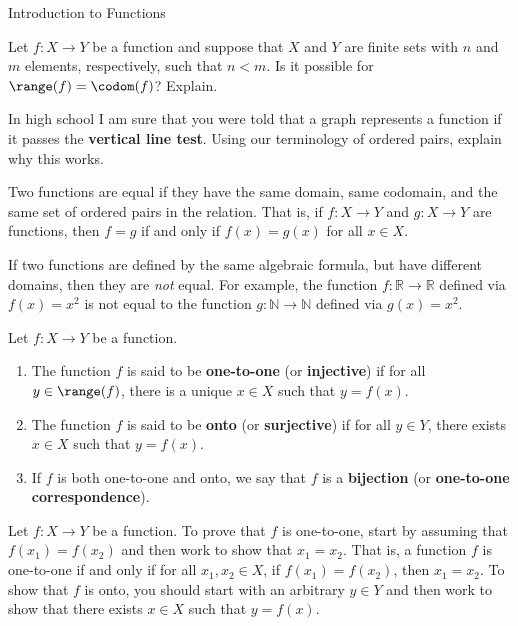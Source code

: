 \begin{section}{Introduction to Functions}
\begin{problem}
Let $f:X\to Y$ be a function and suppose that $X$ and $Y$ are finite sets with $n$ and $m$ elements, respectively, such that $n<m$.  Is it possible for $\range(f)=\codom(f)$?  Explain.
\end{problem}

\begin{problem}
In high school I am sure that you were told that a graph represents a function if it passes the \textbf{vertical line test}.  Using our terminology of ordered pairs, explain why this works.
\end{problem}

\begin{definition}
Two functions are equal if they have the same domain, same codomain, and the same set of ordered pairs in the relation. That is, if $f:X\to Y$ and $g:X\to Y$ are functions, then $f=g$ if and only if $f(x)=g(x)$ for all $x\in X$.
\end{definition}

If two functions are defined by the same algebraic formula, but have different domains, then they are \emph{not} equal.  For example, the function $f:\mathbb{R}\to \mathbb{R}$ defined via $f(x)=x^{2}$ is not equal to the function $g:\mathbb{N}\to\mathbb{N}$ defined via $g(x)=x^{2}$.

\begin{definition}
Let $f:X\to Y$ be a function.
\begin{enumerate}[label=\textrm{(\alph*)}]
\item The function $f$ is said to be \textbf{one-to-one} (or \textbf{injective}) if for all $y\in \range(f)$, there is a unique $x\in X$ such that $y=f(x)$.
\item The function $f$ is said to be \textbf{onto} (or \textbf{surjective}) if for all $y\in Y$, there exists $x\in X$ such that $y=f(x)$.
\item If $f$ is both one-to-one and onto, we say that $f$ is a \textbf{bijection} (or \textbf{one-to-one correspondence}).
\end{enumerate}
\end{definition}

\begin{remark}
Let $f:X\to Y$ be a function. To prove that $f$ is one-to-one, start by assuming that $f(x_{1})=f(x_{2})$ and then work to show that $x_{1}=x_{2}$.  That is, a function $f$ is one-to-one if and only if for all $x_{1}, x_{2}\in X$, if $f(x_{1})=f(x_{2})$, then $x_{1}=x_{2}$. To show that $f$ is onto, you should start with an arbitrary $y\in Y$ and then work to show that there exists $x\in X$ such that $y=f(x)$.
\end{remark}


\end{section}
